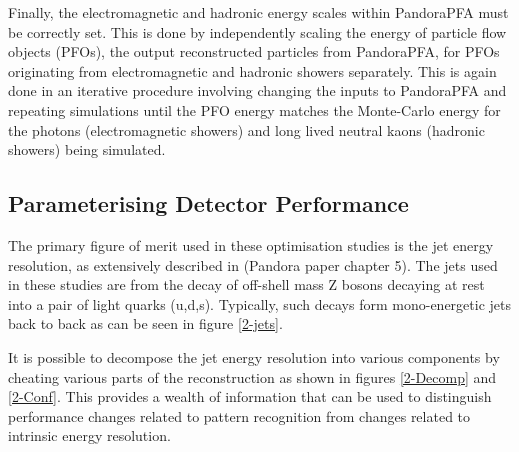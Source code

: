 \documentclass[final,3p,times,twocolumn]{elsarticle}
\begin{document}
Finally, the electromagnetic and hadronic energy scales within PandoraPFA must be correctly set.  This is done by independently scaling the energy of particle flow objects (PFOs), the output reconstructed particles from PandoraPFA, for PFOs originating from electromagnetic and hadronic showers separately.  This is again done in an iterative procedure involving changing the inputs to PandoraPFA and repeating simulations until the PFO energy matches the Monte-Carlo energy for the photons (electromagnetic showers) and long lived neutral kaons (hadronic showers) being simulated.  

\subsection{Parameterising Detector Performance}

The primary figure of merit used in these optimisation studies is the jet energy resolution, as extensively described in (Pandora paper chapter 5).  The jets used in these studies are from the decay of off-shell mass Z bosons decaying at rest into a pair of light quarks (u,d,s).  Typically, such decays form mono-energetic jets back to back as can be seen in figure \ref{2-jets}.  

It is possible to decompose the jet energy resolution into various components by cheating various parts of the reconstruction as shown in figures \ref{2-Decomp} and \ref{2-Conf}.  This provides a wealth of information that can be used to distinguish performance changes related to pattern recognition from changes related to intrinsic energy resolution.
\end{document}
